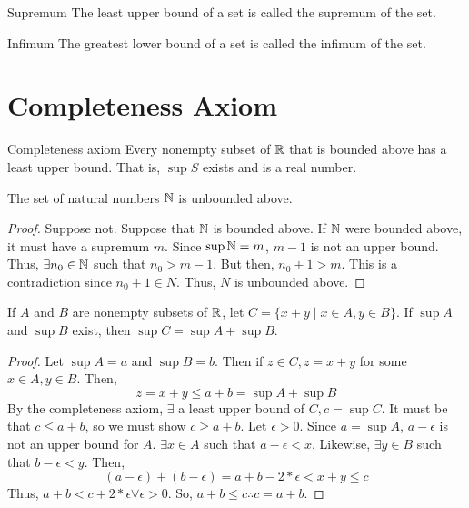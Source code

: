 \begin{definition}{Supremum}{}
    The least upper bound of a set is called the supremum of the set.
\end{definition}
\begin{definition}{Infimum}{}
    The greatest lower bound of a set is called the infimum of the set.
\end{definition}

\section{Completeness Axiom}
\begin{definition}{Completeness axiom}{}
    Every nonempty subset of $\mathbb{R}$ that is bounded above has a least upper bound. That is, $\sup S$ exists and is a real number.
\end{definition}

\begin{theorem}{}{}
    The set of natural numbers $\mathbb{N}$ is unbounded above.
\end{theorem}
\begin{proof}
    Suppose not. Suppose that $\mathbb{N}$ is bounded above. If $\mathbb{N}$ were bounded above, it must have a supremum $m$. Since $\sup \mathbb{N} = m$, $m - 1$ is not an upper bound. Thus, $\exists n_0 \in \mathbb{N}$ such that $n_0 > m - 1$. But then, $n_0 + 1 > m$. This is a contradiction since $n_0 + 1 \in N$. Thus, $N$ is unbounded above.
\end{proof}

\begin{theorem}{}{}
    If $A$ and $B$ are nonempty subsets of $\mathbb{R}$, let $C = \{x + y \mid x \in A, y \in B\}$. If $\sup A$ and $\sup B$ exist, then $\sup C = \sup A + \sup B$.
\end{theorem}
\begin{proof}
    Let $\sup A = a$ and $\sup B = b$. Then if $z \in C, z = x + y$ for some $x \in A, y \in B$. Then,
    $$ z = x + y \leq a + b = \sup A + \sup B $$
    By the completeness axiom, $\exists$ a least upper bound of $C, c = \sup C$. It must be that $c \leq a + b$, so we must show $c \geq a + b$. Let $\epsilon > 0$. Since $a = \sup A$, $a - \epsilon$ is not an upper bound for $A$. $\exists x \in A$ such that $a - \epsilon < x$. Likewise, $\exists y \in B$ such that $b - \epsilon < y$. Then,
    $$ (a - \epsilon) + (b - \epsilon) = a + b - 2 * \epsilon < x + y \leq c $$
    Thus, $a + b < c + 2 * \epsilon \forall \epsilon > 0$. So, $a + b \leq c \therefore c = a + b$.
\end{proof}